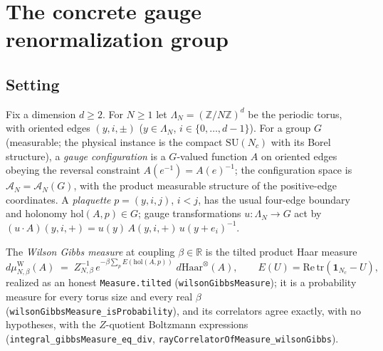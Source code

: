 \documentclass[11pt]{article}
\theoremstyle{definition}
\newcommand{\lean}[1]{\texttt{#1}}
\newcommand{\Torus}[1]{\Lambda_{#1}}
\newcommand{\Conf}[1]{\mathcal{A}_{#1}}
\newcommand{\SU}{\mathrm{SU}}
\newcommand{\holo}{\mathrm{hol}}
\newcommand{\muW}{\mu^{\mathrm{W}}}
\begin{document}
\section{The concrete gauge renormalization group}\label{sec:rg}

\subsection{Setting}\label{sec:rg:setting}

Fix a dimension $d \ge 2$.  For $N \ge 1$ let
$\Torus{N} = (\mathbb{Z}/N\mathbb{Z})^d$ be the periodic torus, with
oriented edges $(y, i, \pm)$ ($y \in \Torus{N}$, $i \in \{0, \dots,
d-1\}$).  For a group $G$ (measurable; the physical instance is the
compact $\SU(N_c)$ with its Borel structure), a \emph{gauge
configuration} is a $G$-valued function $A$ on oriented edges obeying
the reversal constraint $A(e^{-1}) = A(e)^{-1}$; the configuration
space is $\Conf{N} = \Conf{N}(G)$, with the product measurable
structure of the positive-edge coordinates.  A \emph{plaquette}
$p = (y, i, j)$, $i < j$, has the usual four-edge boundary and
holonomy $\holo(A, p) \in G$; gauge transformations
$u : \Torus{N} \to G$ act by
$(u \cdot A)(y, i, +) = u(y)\, A(y, i, +)\, u(y + e_i)^{-1}$.

The \emph{Wilson Gibbs measure} at coupling $\beta \in \mathbb{R}$ is
the tilted product Haar measure
\begin{equation}\label{eq:wilson}
d\muW_{N,\beta}(A) \;=\;
Z_{N,\beta}^{-1}\,
e^{-\beta \sum_{p} E(\holo(A,p))}\; d\mathrm{Haar}^{\otimes}(A),
\qquad E(U) = \mathrm{Re}\,\mathrm{tr}(\mathbf{1}_{N_c} - U),
\end{equation}
realized as an honest \lean{Measure.tilted}
(\lean{wilsonGibbsMeasure}); it is a probability measure for every
torus size and every real $\beta$
(\lean{wilsonGibbsMeasure\_isProbability}), and its correlators agree
exactly, with no hypotheses, with the $Z$-quotient Boltzmann
expressions (\lean{integral\_gibbsMeasure\_eq\_div},
\lean{rayCorrelatorOfMeasure\_wilsonGibbs}).
\end{document}
